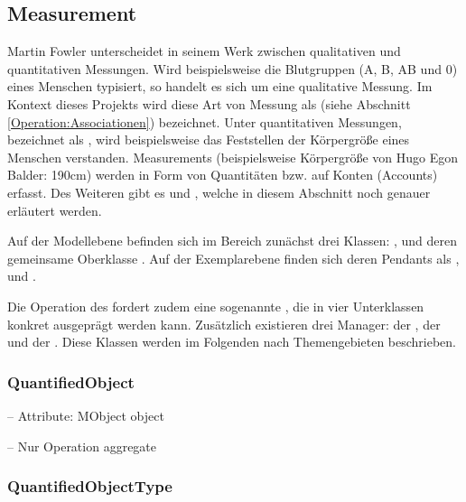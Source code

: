 \subsection{Measurement}
Martin Fowler unterscheidet in seinem Werk  zwischen qualitativen und quantitativen Messungen. 
Wird beispielsweise die Blutgruppen (A, B, AB und 0) eines Menschen typisiert, so handelt es sich um eine qualitative Messung. 
Im Kontext dieses Projekts wird diese Art von Messung als  (siehe Abschnitt \ref{Operation:Associationen}) bezeichnet. 
Unter quantitativen Messungen, bezeichnet als , wird beispielsweise das Feststellen der Körpergröße eines Menschen verstanden.
Measurements (beispielsweise Körpergröße von Hugo Egon Balder: 190cm) werden in Form von Quantitäten bzw.  auf Konten (Accounts) erfasst.
Des Weiteren gibt es  und , welche in diesem Abschnitt noch genauer erläutert werden.


Auf der Modellebene befinden sich im Bereich  zunächst drei Klassen: , 
und deren gemeinsame Oberklasse . Auf der Exemplarebene finden sich deren Pendants als ,
 und .

Die Operation  des  fordert zudem eine sogenannte ,
die in vier Unterklassen konkret ausgeprägt werden kann.
Zusätzlich existieren drei Manager: der , der  und der .
Diese Klassen werden im Folgenden nach Themengebieten beschrieben.


\subsubsection{QuantifiedObject}


-- Attribute: MObject object

-- Nur Operation aggregate


\subsubsection{QuantifiedObjectType}

